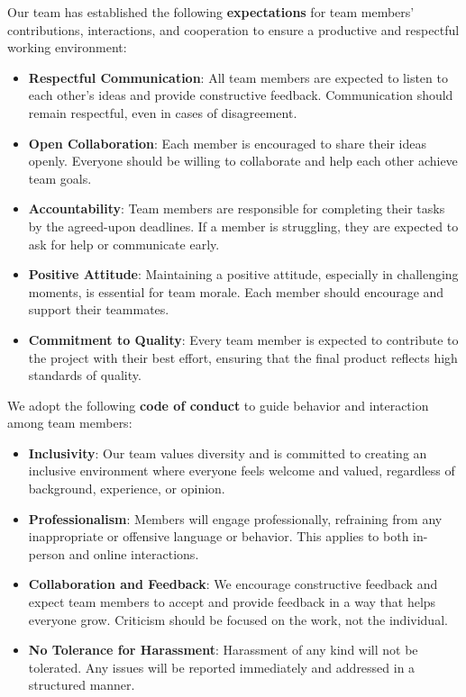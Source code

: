 \documentclass{article}
\begin{document}
Our team has established the following \textbf{expectations} for team
members' contributions, interactions, and cooperation to ensure a
productive and respectful working environment:

\begin{itemize}
  \item \textbf{Respectful Communication}: All team members are
    expected to listen to each other’s ideas and provide constructive
    feedback. Communication should remain respectful, even in cases
    of disagreement.
  \item \textbf{Open Collaboration}: Each member is encouraged to
    share their ideas openly. Everyone should be willing to
    collaborate and help each other achieve team goals.
  \item \textbf{Accountability}: Team members are responsible for
    completing their tasks by the agreed-upon deadlines. If a member
    is struggling, they are expected to ask for help or communicate early.
  \item \textbf{Positive Attitude}: Maintaining a positive attitude,
    especially in challenging moments, is essential for team morale.
    Each member should encourage and support their teammates.
  \item \textbf{Commitment to Quality}: Every team member is expected
    to contribute to the project with their best effort, ensuring
    that the final product reflects high standards of quality.
\end{itemize}

\noindent
We adopt the following \textbf{code of conduct} to guide behavior and
interaction among team members:

\begin{itemize}
  \item \textbf{Inclusivity}: Our team values diversity and is
    committed to creating an inclusive environment where everyone
    feels welcome and valued, regardless of background, experience, or opinion.
  \item \textbf{Professionalism}: Members will engage professionally,
    refraining from any inappropriate or offensive language or
    behavior. This applies to both in-person and online interactions.
  \item \textbf{Collaboration and Feedback}: We encourage
    constructive feedback and expect team members to accept and
    provide feedback in a way that helps everyone grow. Criticism
    should be focused on the work, not the individual.
  \item \textbf{No Tolerance for Harassment}: Harassment of any kind
    will not be tolerated. Any issues will be reported immediately
    and addressed in a structured manner.
\end{itemize}
\end{document}
